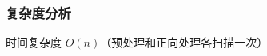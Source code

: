 \documentclass[../mainReport.tex]{subfiles}
\begin{document}
\subsubsection{复杂度分析}
时间复杂度 $O(n)$（预处理和正向处理各扫描一次）


    
    
    
    
\end{document}
